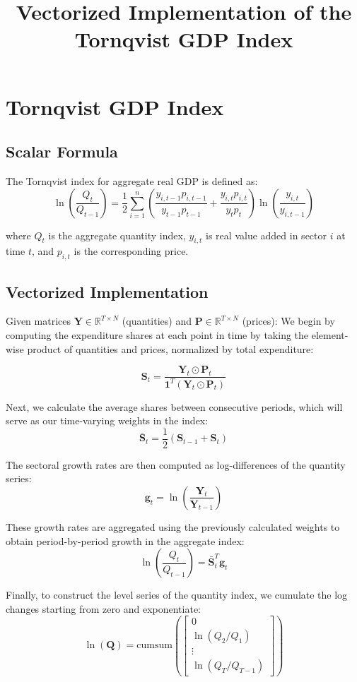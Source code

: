 \documentclass[12pt,english]{article}
\title{Vectorized Implementation of the Tornqvist GDP Index}
\author{}
\date{}
\begin{document}
\maketitle

\section{Tornqvist GDP Index}

\subsection{Scalar Formula}
The Tornqvist index for aggregate real GDP is defined as:
$$\ln\left(\frac{Q_t}{Q_{t-1}}\right) = \frac{1}{2}\sum_{i=1}^{n}\left(\frac{y_{i,t-1}p_{i,t-1}}{y_{t-1}p_{t-1}} + \frac{y_{i,t}p_{i,t}}{y_{t}p_{t}}\right)\ln\left(\frac{y_{i,t}}{y_{i,t-1}}\right)$$

where $Q_t$ is the aggregate quantity index, $y_{i,t}$ is real value added in sector $i$ at time $t$, and $p_{i,t}$ is the corresponding price.

\subsection{Vectorized Implementation}
Given matrices $\mathbf{Y} \in \mathbb{R}^{T \times N}$ (quantities) and $\mathbf{P} \in \mathbb{R}^{T \times N}$ (prices):
We begin by computing the expenditure shares at each point in time by taking the element-wise product of quantities and prices, normalized by total expenditure:

$$\mathbf{S}_{t} = \frac{\mathbf{Y}_t \odot \mathbf{P}_t}{\mathbf{1}^T(\mathbf{Y}_t \odot \mathbf{P}_t)}$$

Next, we calculate the average shares between consecutive periods, which will serve as our time-varying weights in the index:
$$\bar{\mathbf{S}}_{t} = \frac{1}{2}(\mathbf{S}_{t-1} + \mathbf{S}_t)$$

The sectoral growth rates are then computed as log-differences of the quantity series:
$$\mathbf{g}_t = \ln\left(\frac{\mathbf{Y}_t}{\mathbf{Y}_{t-1}}\right)$$

These growth rates are aggregated using the previously calculated weights to obtain period-by-period growth in the aggregate index:
$$\ln\left(\frac{Q_t}{Q_{t-1}}\right) = \bar{\mathbf{S}}_{t}^T \mathbf{g}_t$$

Finally, to construct the level series of the quantity index, we cumulate the log changes starting from zero and exponentiate:
$$\ln(\mathbf{Q}) = \text{cumsum}\left(\begin{bmatrix} 0 \\ \ln(Q_2/Q_1) \\ \vdots \\ \ln(Q_T/Q_{T-1}) \end{bmatrix}\right)$$
\end{document}
